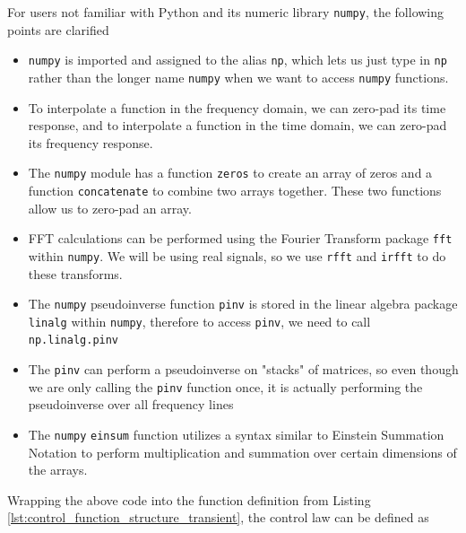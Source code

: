 \documentclass[pdf,12pt,report]{SANDreport}
\newcommand{\inlineCode}{\lstinline[basicstyle=\bfseries\ttfamily]}
\begin{document}
    For users not familiar with Python and its numeric library \inlineCode{numpy}, the following points are clarified
    \begin{itemize}
        \item \inlineCode{numpy} is imported and assigned to the alias \inlineCode{np}, which lets us just type in \inlineCode{np} rather than the longer name \inlineCode{numpy} when we want to access \inlineCode{numpy} functions.
        \item To interpolate a function in the frequency domain, we can zero-pad its time response, and to interpolate a function in the time domain, we can zero-pad its frequency response.
        \item The \inlineCode{numpy} module has a function \inlineCode{zeros} to create an array of zeros and a function \inlineCode{concatenate} to combine two arrays together.  These two functions allow us to zero-pad an array.
        \item \Ac{FFT} calculations can be performed using the Fourier Transform package \inlineCode{fft} within \inlineCode{numpy}.  We will be using real signals, so we use \inlineCode{rfft} and \inlineCode{irfft} to do these transforms.
        \item The \inlineCode{numpy} pseudoinverse function \inlineCode{pinv} is stored in the linear algebra package \inlineCode{linalg} within \inlineCode{numpy}, therefore to access \inlineCode{pinv}, we need to call \inlineCode{np.linalg.pinv}
        \item The \inlineCode{pinv} can perform a pseudoinverse on "stacks" of matrices, so even though we are only calling the \inlineCode{pinv} function once, it is actually performing the pseudoinverse over all frequency lines
        \item The \inlineCode{numpy} \inlineCode{einsum} function utilizes a syntax similar to Einstein Summation Notation to perform multiplication and summation over certain dimensions of the arrays.
    \end{itemize}
    
    Wrapping the above code into the function definition from Listing \ref{lst:control_function_structure_transient}, the control law can be defined as
    
\end{document}
